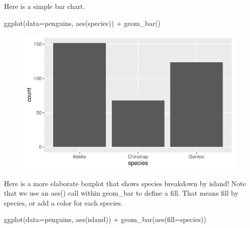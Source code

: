 \documentclass[
  letterpaper,
  DIV=11,
  numbers=noendperiod]{scrartcl}
\newenvironment{Shaded}{\begin{snugshade}}{\end{snugshade}}
\newcommand{\AttributeTok}[1]{\textcolor[rgb]{0.40,0.45,0.13}{#1}}
\newcommand{\FunctionTok}[1]{\textcolor[rgb]{0.28,0.35,0.67}{#1}}
\newcommand{\NormalTok}[1]{\textcolor[rgb]{0.00,0.23,0.31}{#1}}
\newcommand{\SpecialCharTok}[1]{\textcolor[rgb]{0.37,0.37,0.37}{#1}}
\begin{document}
Here is a simple bar chart.

\begin{Shaded}
\begin{Highlighting}[]
\FunctionTok{ggplot}\NormalTok{(}\AttributeTok{data=}\NormalTok{penguins, }\FunctionTok{aes}\NormalTok{(species)) }\SpecialCharTok{+}
  \FunctionTok{geom\_bar}\NormalTok{()}
\end{Highlighting}
\end{Shaded}

\begin{figure}[H]

{\centering \includegraphics{Lab_2_files/figure-pdf/unnamed-chunk-10-1.pdf}

}

\end{figure}

Here is a more elaborate boxplot that shows species breakdown by island!
Note that we use an aes() call within geom\_bar to define a fill. That
means fill by species, or add a color for each species.

\begin{Shaded}
\begin{Highlighting}[]
\FunctionTok{ggplot}\NormalTok{(}\AttributeTok{data=}\NormalTok{penguins, }\FunctionTok{aes}\NormalTok{(island)) }\SpecialCharTok{+}
  \FunctionTok{geom\_bar}\NormalTok{(}\FunctionTok{aes}\NormalTok{(}\AttributeTok{fill=}\NormalTok{species))}
\end{Highlighting}
\end{Shaded}
\end{document}
